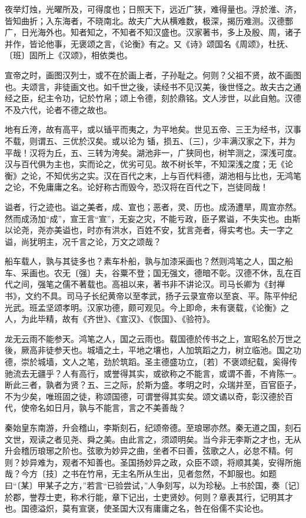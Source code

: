 \documentclass[]{article}
\begin{document}
夜举灯烛，光曜所及，可得度也；日照天下，远近广狭，难得量也。浮於淮、济，皆知曲折；入东海者，不晓南北。故夫广大从横难数，极深，揭历难测。汉德酆广，日光海外也。知者知之，不知者不知汉盛也。汉家著书，多上及殷、周，诸子并作，皆论他事，无褒颂之言，《论衡》有之。又《诗》颂国名《周颂》，杜抚、〔班〕固所上《汉颂》，相依类也。

宣帝之时，画图汉列士，或不在於画上者，子孙耻之。何则？父祖不贤，故不画图也。夫颂言，非徒画文也。如千世之後，读经书不见汉美，後世怪之。故夫古之通经之臣，纪主令功，记於竹帛；颂上令德，刻於鼎铭。文人涉世，以此自勉。汉德不及六代，论者不德之故也。

地有丘洿，故有高平，或以锸平而夷之，为平地矣。世见五帝、三王为经书，汉事不载，则谓五、三优於汉矣。或以论为锸，损五、〔三〕，少丰满汉家之下，并为平哉！汉将为丘，五、三转为洿矣。湖池非一，广狭同也，树竿测之，深浅可度。汉与百代俱为主也，实而论之，优劣可见。故不树长竿，不知深浅之度；无《论衡》之论，不知优劣之实。汉在百代之末，上与百代料德，湖池相与比也，无鸿笔之论，不免庸庸之名。论好称古而毁今，恐汉将在百代之下，岂徒同哉！

谥者，行之迹也。谥之美者，成、宣也；恶者，灵、历也。成汤遭旱，周宣亦然。然而成汤加``成''，宣王言``宣''，无妄之灾，不能亏政，臣子累谥，不失实也。由斯以论尧，尧亦美谥也，时亦有洪水，百姓不安，犹言尧者，得实考也。夫一字之谥，尚犹明主，况千言之论，万文之颂哉？

船车载人，孰与其徒多也？素车朴船，孰与加漆采画也？然则鸿笔之人，国之船车、采画也。农无〔强〕夫，谷粟不登；国无强文，德暗不彰。汉德不休，乱在百代之间，强笔之儒不著载也。高祖以来，著书非不讲论汉。司马长卿为《封禅书》，文约不具。司马子长纪黄帝以至孝武，扬子云录宣帝以至哀、平。陈平仲纪光武。班孟坚颂孝明。汉家功德，颇可观见。今上即命，未有褒载，《论衡》之人，为此毕精，故有《齐世》、《宣汉》、《恢国》、《验符》。

龙无云雨不能参天。鸿笔之人，国之云雨也。载国德於传书之上，宣昭名於万世之後，厥高非徒参天也。城墙之土，平地之壤也，人加筑蹈之力，树立临池。国之功德，崇於城墙，文人之笔，劲於筑蹈。圣主德盛功立，〔若〕不褒颂纪载，奚得传驰流去无疆乎？人有高行，或誉得其实，或欲称之不能言，或谓不善，不肯陈一。断此三者，孰者为贤？五、三之际，於斯为盛。孝明之时，众瑞并至，百官臣子，不为少矣，唯班固之徒，称颂国德，可谓誉得其实矣。颂文谲以奇，彰汉德於百代，使帝名如日月，孰与不能言，言之不美善哉？

秦始皇东南游，升会稽山，李斯刻石，纪颂帝德。至琅琊亦然。秦无道之国，刻石文世，观读之者见尧、舜之美。由此言之，须颂明矣。当今非无李斯之才也，无从升会稽历琅琊之阶也。弦歌为妙异之曲，坐者不曰善，弦歌之人，必怠不精。何则？妙异难为，观者不知善也。圣国扬妙异之政，众臣不颂，将顺其美，安得所施哉？今方〔技〕之书在竹帛，无主名所从生出，见者忽然，不卸服也。如题曰``〔某〕甲某子之方，''若言``已验尝试，''人争刻写，以为珍秘。上书於国，奏〔记〕於郡，誉荐士吏，称术行能，章下记出，士吏贤妙。何则？章表其行，记明其才也。国德溢炽，莫有宣褒，使圣国大汉有庸庸之名，咎在俗儒不实论也。
\end{document}
